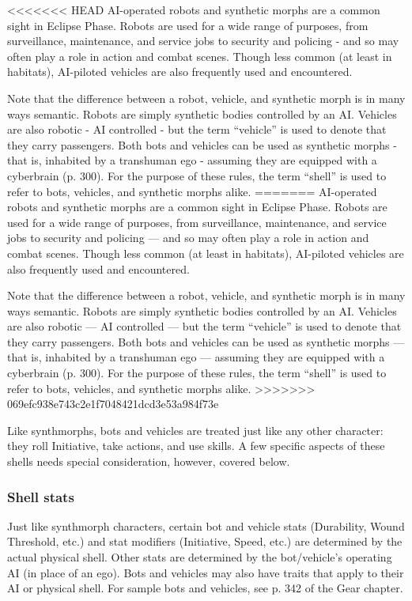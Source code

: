 <<<<<<< HEAD AI-operated robots and synthetic morphs are a common sight in Eclipse Phase. Robots are used for a wide range of purposes, from surveillance, maintenance, and service jobs to security and policing - and so may often play a role in action and combat scenes. Though less common (at least in habitats), AI-piloted vehicles are also frequently used and encountered. 

Note that the difference between a robot, vehicle, and synthetic morph is in many ways semantic. Robots are simply synthetic bodies controlled by an AI. Vehicles are also robotic - AI controlled - but the term ``vehicle'' is used to denote that they carry passengers. Both bots and vehicles can be used as synthetic morphs - that is, inhabited by a transhuman ego - assuming they are equipped with a cyberbrain (p. 300). For the purpose of these rules, the term ``shell'' is used to refer to bots, vehicles, and synthetic morphs alike. ======= AI-operated robots and synthetic morphs are a common sight in Eclipse Phase. Robots are used for a wide range of purposes, from surveillance, maintenance, and service jobs to security and policing --- and so may often play a role in action and combat scenes. Though less common (at least in habitats), AI-piloted vehicles are also frequently used and encountered. 

Note that the difference between a robot, vehicle, and synthetic morph is in many ways semantic. Robots are simply synthetic bodies controlled by an AI. Vehicles are also robotic --- AI controlled --- but the term ``vehicle'' is used to denote that they carry passengers. Both bots and vehicles can be used as synthetic morphs --- that is, inhabited by a transhuman ego --- assuming they are equipped with a cyberbrain (p. 300). For the purpose of these rules, the term ``shell'' is used to refer to bots, vehicles, and synthetic morphs alike. >>>>>>> 069efc938e743c2e1f7048421dcd3e53a984f73e 

Like synthmorphs, bots and vehicles are treated just like any other character: they roll Initiative, take actions, and use skills. A few specific aspects of these shells needs special consideration, however, covered below. 

\subsubsection{Shell stats} 

Just like synthmorph characters, certain bot and vehicle stats (Durability, Wound Threshold, etc.) and stat modifiers (Initiative, Speed, etc.) are determined by the actual physical shell. Other stats are determined by the bot/vehicle’s operating AI (in place of an ego). Bots and vehicles may also have traits that apply to their AI or physical shell. For sample bots and vehicles, see p. 342 of the Gear chapter. 

